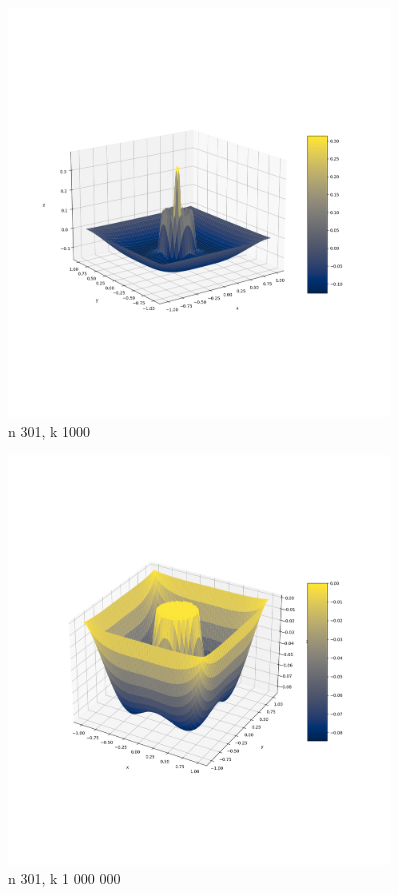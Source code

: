 \documentclass{article}
\begin{document}
    \begin{figure}[h]
        \centering
        \includegraphics[width=0.9\textwidth]{nal1_n301_k1000.png}
        \caption{n 301, k 1000}
    \end{figure}

    \begin{figure}[h]
        \centering
        \includegraphics[width=0.9\textwidth]{nal1_n301_k1e6.png}
        \caption{n 301, k 1 000 000}
    \end{figure}
\end{document}
